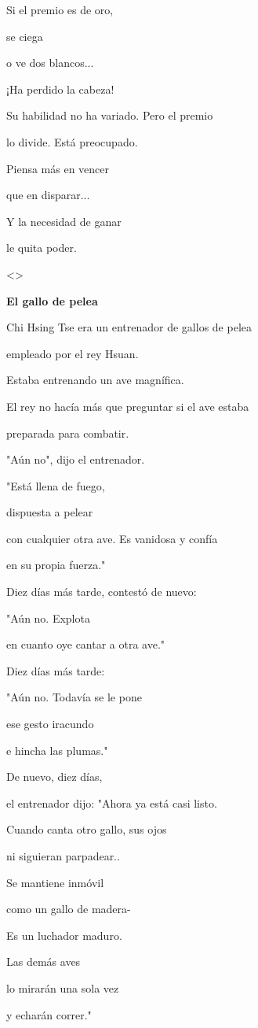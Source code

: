 Si el premio es de oro,

se ciega

o ve dos blancos...

¡Ha perdido la cabeza!

Su habilidad no ha variado. Pero el premio

lo divide. Está preocupado.

Piensa más en vencer

que en disparar...

Y la necesidad de ganar

le quita poder.

\textless\textgreater{}

\textbf{{El gallo de pelea}}

Chi Hsing Tse era un entrenador de gallos de pelea

empleado por el rey Hsuan.

Estaba entrenando un ave magnífica.

El rey no hacía más que preguntar si el ave estaba

preparada para combatir.

"Aún no", dijo el entrenador.

"Está llena de fuego,

dispuesta a pelear

con cualquier otra ave. Es vanidosa y confía

en su propia fuerza."

Diez días más tarde, contestó de nuevo:

"Aún no. Explota

en cuanto oye cantar a otra ave."

Diez días más tarde:

"Aún no. Todavía se le pone

ese gesto iracundo

e hincha las plumas."

De nuevo, diez días,

el entrenador dijo: "Ahora ya está casi listo.

Cuando canta otro gallo, sus ojos

ni siguieran parpadear..

Se mantiene inmóvil

como un gallo de madera-

Es un luchador maduro.

Las demás aves

lo mirarán una sola vez

y echarán correr."


